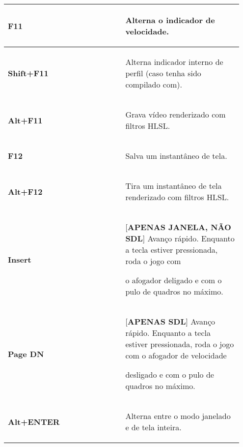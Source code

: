 \documentclass[letterpaper,10pt,brazil]{sphinxmanual}
\begin{document}
\begin{longtable}{|p{0.475\linewidth}|p{0.475\linewidth}|}
\textbf{F11}
&
\begin{DUlineblock}{0em}
\item[] Alterna o indicador de velocidade.
\end{DUlineblock}
\\
\hline
\textbf{Shift+F11}
&
\begin{DUlineblock}{0em}
\item[] Alterna indicador interno de perfil (caso tenha sido compilado com).
\end{DUlineblock}
\\
\hline
\textbf{Alt+F11}
&
\begin{DUlineblock}{0em}
\item[] Grava vídeo renderizado com filtros HLSL.
\end{DUlineblock}
\\
\hline
\textbf{F12}
&
\begin{DUlineblock}{0em}
\item[] Salva um instantâneo de tela.
\end{DUlineblock}
\\
\hline
\textbf{Alt+F12}
&
\begin{DUlineblock}{0em}
\item[] Tira um instantâneo de tela renderizado com filtros HLSL.
\end{DUlineblock}
\\
\hline
\textbf{Insert}
&
\begin{DUlineblock}{0em}
\item[] {[}\textbf{APENAS JANELA, NÃO SDL}{]} Avanço rápido. Enquanto a tecla estiver pressionada, roda o jogo com
\item[] o afogador deligado e com o pulo de quadros no máximo.
\end{DUlineblock}
\\
\hline
\textbf{Page DN}
&
\begin{DUlineblock}{0em}
\item[] {[}\textbf{APENAS SDL}{]} Avanço rápido. Enquanto a tecla estiver pressionada, roda o jogo com o afogador de velocidade
\item[] desligado e com o pulo de quadros no máximo.
\end{DUlineblock}
\\
\hline
\textbf{Alt+ENTER}
&
\begin{DUlineblock}{0em}
\item[] Alterna entre o modo janelado e de tela inteira.
\end{DUlineblock}
\\

\end{longtable}
\end{document}
